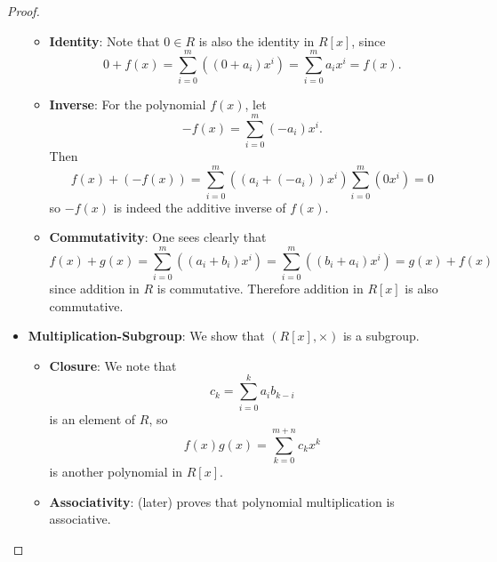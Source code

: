 \begin{proof}
\begin{itemize}
\begin{itemize}
            \item \textbf{Identity}: Note that $0 \in R$ is also the identity in $R[x]$, since
            \[
                0 + f(x) = \sum_{i=0}^m\left((0+a_i)x^i\right) = \sum_{i=0}^ma_ix^i = f(x).
            \]

            \item \textbf{Inverse}: For the polynomial $f(x)$, let
            \[
                -f(x) = \sum_{i=0}^m(-a_i)x^i.
            \]
            Then
            \[
                f(x) + (-f(x)) = \sum_{i=0}^m\left((a_i+(-a_i))x^i\right) \sum_{i=0}^m\left(0x^i\right) = 0
           \]
           so $-f(x)$ is indeed the additive inverse of $f(x)$.

            \item \textbf{Commutativity}: One sees clearly that
            \[
                f(x) + g(x) = \sum_{i=0}^m\left((a_i+b_i)x^i\right) = \sum_{i=0}^m\left((b_i + a_i)x^i\right) = g(x) + f(x)
            \]
            since addition in $R$ is commutative. Therefore addition in $R[x]$ is also commutative.
        \end{itemize}

        \item \textbf{Multiplication-Subgroup}: We show that $(R[x], \times)$ is a subgroup.
        \begin{itemize}
            \item \textbf{Closure}: We note that
            \[
                c_k = \sum_{i=0}^k a_ib_{k-i}
            \]
            is an element of $R$, so
            \[
                f(x)g(x) = \sum_{k=0}^{m+n}c_kx^k
            \]
            is another polynomial in $R[x]$.

            \item \textbf{Associativity}:  (later) proves that polynomial multiplication is associative.
        \end{itemize}


\end{itemize}
\end{proof}
